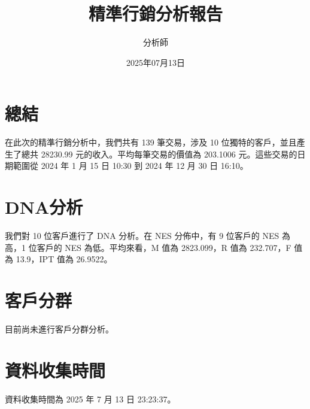 \documentclass{article}
\title{精準行銷分析報告}
\author{分析師}
\date{2025年07月13日}
\begin{document}
\maketitle

\maketitle

\section{總結}

在此次的精準行銷分析中，我們共有 139 筆交易，涉及 10 位獨特的客戶，並且產生了總共 28230.99 元的收入。平均每筆交易的價值為 203.1006 元。這些交易的日期範圍從 2024 年 1 月 15 日 10:30 到 2024 年 12 月 30 日 16:10。

\section{DNA分析}

我們對 10 位客戶進行了 DNA 分析。在 NES 分佈中，有 9 位客戶的 NES 為高，1 位客戶的 NES 為低。平均來看，M 值為 2823.099，R 值為 232.707，F 值為 13.9，IPT 值為 26.9522。

\section{客戶分群}

目前尚未進行客戶分群分析。

\section{資料收集時間}

資料收集時間為 2025 年 7 月 13 日 23:23:37。
\end{document}
